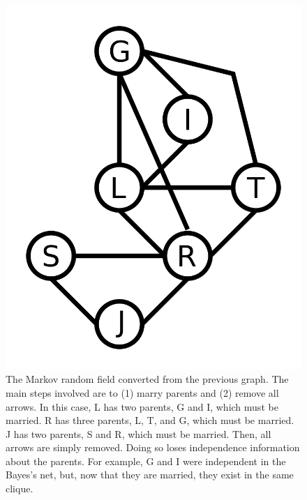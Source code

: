 \documentclass{article}
\begin{document}
\begin{figure}
	\centering
	\includegraphics[width=120mm]{figs/education-mrf.png}
	\caption{The Markov random field converted from the previous graph. The 
        main steps involved are to (1) marry parents and (2) remove all arrows.
        In this case, L has two parents, G and I, which must be married. R has 
        three parents, L, T, and G, which must be married. J has two parents, S 
        and R, which must be married. Then, all arrows are simply removed. Doing 
        so loses independence information about the parents. For example, G and 
        I were independent in the Bayes's net, but, now that they are married, 
        they exist in the same clique.}
\end{figure}
\end{document}
